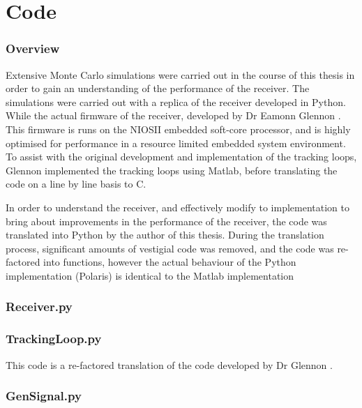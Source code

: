 \chapter{Code}
\label{ch:Code}

\subsection{Overview}

Extensive Monte Carlo simulations were carried out in the course of this thesis in order to gain an understanding of the performance of the receiver.  The simulations were carried out with a replica of the receiver developed in Python. While the actual firmware of the receiver, developed by Dr Eamonn Glennon \cite{Glennon11aquariusfirmware} \cite{FirmwareCode}. This firmware is runs on the NIOSII embedded soft-core processor, and is highly optimised for performance in a resource limited embedded system environment. To assist with the original development and implementation of the tracking loops, Glennon implemented the tracking loops using Matlab\cite{MatlabCode}, before translating the code on a line by line basis to C. 

In order to understand the receiver, and effectively modify to implementation to bring about improvements in the performance of the receiver, the code was translated into Python by the author of this thesis. During the translation process, significant amounts of vestigial code was removed, and the code was re-factored into functions, however the actual behaviour of the Python implementation (Polaris) is identical to the Matlab implementation


\subsection{Receiver.py}


\subsection{TrackingLoop.py}
This code is a re-factored translation of the code developed by Dr Glennon \cite{MatlabCode}.


\subsection{GenSignal.py}


